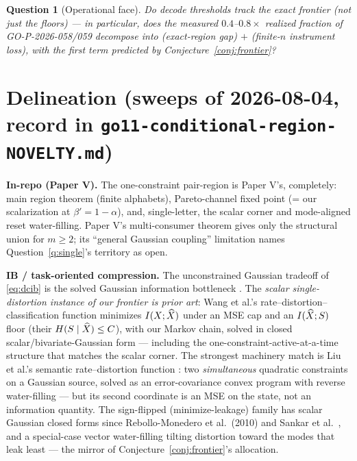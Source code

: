 \documentclass[11pt]{article}
\newtheorem{question}{Question}\newtheorem{remark}{Remark}
\begin{document}
\begin{question}[Operational face]\label{q:oper}
Do decode thresholds track the exact frontier (not just the floors) --- in
particular, does the measured $0.4$--$0.8\times$ realized fraction of
GO-P-2026-058/059 decompose into (exact-region gap) $+$ (finite-$n$
instrument loss), with the first term predicted by
Conjecture~\ref{conj:frontier}?
\end{question}

\section{Delineation (sweeps of 2026-08-04, record in
\texttt{go11-conditional-region-NOVELTY.md})}\label{sec:delineation}

\textbf{In-repo (Paper V).} The one-constraint pair-region is Paper V's,
completely: main region theorem (finite alphabets), Pareto-channel fixed
point (= our scalarization at $\beta'=1-\alpha$), and, single-letter, the
scalar corner and mode-aligned reset water-filling. Paper V's multi-consumer theorem gives
only the structural union for $m\ge2$; its ``general Gaussian coupling''
limitation names Question~\ref{q:single}'s territory as open.

\textbf{IB / task-oriented compression.} The unconstrained Gaussian
tradeoff of \eqref{eq:dcib} is the solved Gaussian information bottleneck
\cite{gib2005}. The \emph{scalar single-distortion instance of our
frontier is prior art}: Wang et al.'s rate--distortion--classification
function \cite{wang2024rdc} minimizes $I(X;\widehat X)$ under an MSE cap and an
$I(\widehat X;S)$ floor (their $H(S\mid\widehat X)\le C$), with our Markov chain, solved
in closed scalar/bivariate-Gaussian form --- including the
one-constraint-active-at-a-time structure that matches the scalar corner.
The strongest machinery match is Liu et al.'s semantic rate--distortion
function \cite{liu2022semantic}: two \emph{simultaneous} quadratic
constraints on a Gaussian source, solved as an error-covariance convex
program with reverse water-filling --- but its second coordinate is an MSE
on the state, not an information quantity. The sign-flipped
(minimize-leakage) family has scalar Gaussian closed forms since
Rebollo-Monedero et al.\ (2010) and Sankar et al.\ \cite{sankar2013}, and a
special-case vector water-filling tilting distortion toward the modes that
leak least \cite{tripathy2019} --- the mirror of
Conjecture~\ref{conj:frontier}'s allocation.
\end{document}
